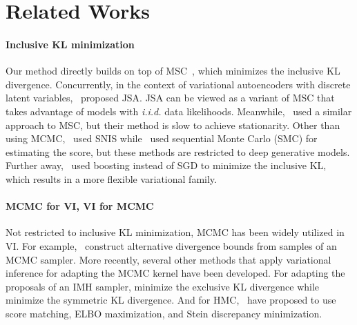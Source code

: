 \vspace{-0.1in}
\section{Related Works}\label{section:related}
\vspace{-0.05in}
\paragraph{Inclusive KL minimization}
Our method directly builds on top of MSC~\citep{NEURIPS2020_b2070693}, which minimizes the inclusive KL divergence.
Concurrently, in the context of variational autoencoders with discrete latent variables,~\citet{pmlr-v124-ou20a} proposed JSA.
JSA can be viewed as a variant of MSC that takes advantage of models with \textit{i.i.d.} data likelihoods.
Meanwhile,~\citet{li_approximate_2017} used a similar approach to MSC, but their method is slow to achieve stationarity.
Other than using MCMC,~\citet{DBLP:journals/corr/BornscheinB14,le_revisiting_2019} used SNIS while~\citet{pmlr-v119-wu20h} used sequential Monte Carlo (SMC) for estimating the score, but these methods are restricted to deep generative models.
Further away,~\citet{pmlr-v161-jerfel21a} used boosting instead of SGD to minimize the inclusive KL, which results in a more flexible variational family.

\vspace{-0.05in}
\paragraph{MCMC for VI, VI for MCMC}
Not restricted to inclusive KL minimization, MCMC has been widely utilized in VI.
For example,~\citet{pmlr-v37-salimans15, pmlr-v97-ruiz19a} construct alternative divergence bounds from samples of an MCMC sampler.
More recently, several other methods that apply variational inference for adapting the MCMC kernel have been developed.
For adapting the proposals of an IMH sampler, \citet{habib2018auxiliary} minimize the exclusive KL divergence while~\cite{neklyudov_metropolishastings_2019} minimize the symmetric KL divergence.
And for HMC,~\citet{zhang_variational_2018, pmlr-v139-campbell21a} have proposed to use score matching, ELBO maximization, and Stein discrepancy minimization.

\vspace{-0.05in}

